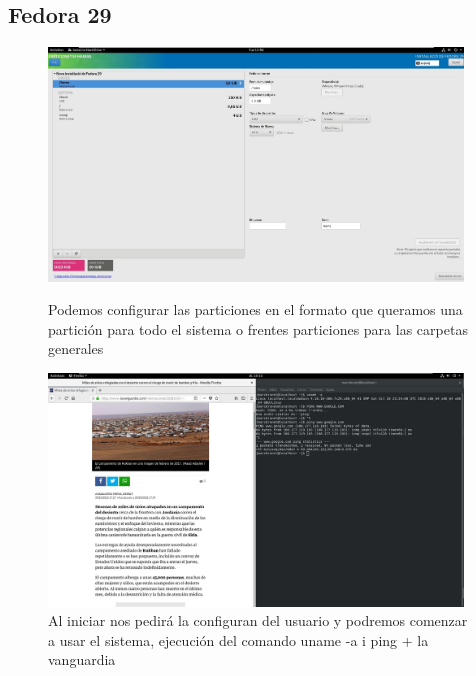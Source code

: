 \documentclass[preprint,11pt]{elsarticle}
\begin{document}
\subsection{Fedora 29}
\begin{figure}[!htbp]
    \begin{center}
        \includegraphics[width=11cm]{fedora3.JPG}
    \end{center}
    \caption{Podemos configurar las particiones en el formato que queramos una partición para todo el sistema o frentes particiones para las carpetas generales}
    \begin{center}
        \includegraphics[width=11cm]{fedora4.JPG}
    \end{center}
    \caption{Al iniciar nos pedirá la configuran del usuario y podremos comenzar a usar el sistema, ejecución del comando uname -a i ping + la vanguardia }
\end{figure}
\end{document}
